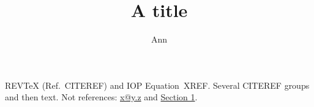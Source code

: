 \title{A title}
\author{Ann}
REVTeX (Ref.~CITEREF) and IOP Equation~XREF.
Several CITEREF groups and then text.
Not references: \href{mailto:x@y.z}{x@y.z} and \hyperref[sec:a]{Section 1}.
